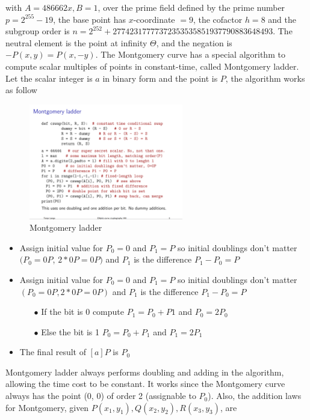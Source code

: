 with $A = 486662x, B = 1$, over the prime field defined by the prime number $p=2^{255}-19$, the base point has $x$-coordinate $= 9$,  the cofactor $h = 8$ and the subgroup order is $n = 2^{252} + 27742317777372353535851937790883648493$. The neutral element is the point at infinity $\Theta$, and the negation is $-P(x, y) = P(x, -y)$. The Montgomery curve has a special algorithm to compute scalar multiples of points in constant-time, called Montgomery ladder. Let the scalar integer is $a$ in binary form and the point is $P$, the algorithm works as follow

\begin{figure}[ht!]
  \centering
  \includegraphics[width=0.6\textwidth]{images/montgomery_ladder.png}
  \caption[Montgomery ladder]{Montgomery ladder}
  \label{fig:montgomery_ladder}
\end{figure}

\begin{itemize}
  \item Assign initial value for $P_0 = 0$ and $P_1 = P$ so initial doublings don’t matter $(P_0 =0P$, $2*0P = 0P)$ and $P_1$ is the difference $P_1 - P_0 = P$
  \item Assign initial value for $P_0 = 0$ and $P_1 = P$ so initial doublings don’t matter $(P_0 =0P, 2*0P = 0P)$ and $P_1$ is the difference $P_1 - P_0 = P$

        \begin{itemize}
          \item[$\bullet$] If the bit is 0 compute $P_1 = P_0 +  P1$ and $P_0 = 2P_0$
          \item[$\bullet$] Else the bit is 1 $P_0 = P_0 +  P_1$ and $P_1 = 2P_1$
        \end{itemize}

  \item The final result of $[a]P$ is $P_0$
\end{itemize}

Montgomery ladder always performs doubling and adding in the algorithm, allowing the time cost to be constant. It works since the Montgomery curve always has the point (0, 0) of order 2 (assignable to $P_0$). Also, the addition laws for Montgomery, given $P(x_1, y_1), Q(x_2, y_2), R(x_3, y_3)$, are

